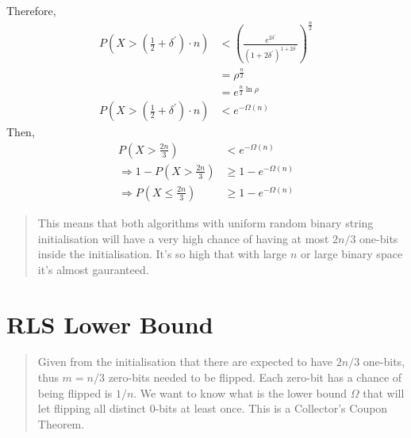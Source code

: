 \documentclass[a4paper, 12pt]{article}
\begin{document}
        Therefore,
        \begin{align*}
            P\left(X > \left(\frac{1}{2} + \delta^\prime\right)\cdot n\right)
            &< \left(\frac{e^{2\delta^\prime}}{(1+2\delta^\prime)^{1+2\delta^\prime}}\right)^{\frac{n}{2}}\\
            &= \rho^{\frac{n}{2}}\\
            &= e^{\frac{n}{2}\ln\rho}\\
            P\left(X > \left(\frac{1}{2} + \delta^\prime\right)\cdot n\right)
            &< e^{-\Omega(n)}
        \end{align*}
        Then,
        \begin{align*}
            P\left(X > \frac{2n}{3}\right) &< e^{-\Omega(n)}\\
            \Rightarrow 1 - P\left(X > \frac{2n}{3}\right) &\geq 1 - e^{-\Omega(n)}\\
            \Rightarrow P\left(X \leq \frac{2n}{3}\right) &\geq 1 - e^{-\Omega(n)}
        \end{align*}
        \begin{quote}
            This means that both algorithms with uniform random binary string initialisation will have a very high chance of having at most $2n/3$ one-bits
            inside the initialisation. It's so high that with large $n$ or large binary space it's almost gauranteed.
        \end{quote}
\section{RLS Lower Bound}
        \begin{quote}
            Given from the initialisation that there are expected to have $2n/3$ one-bits, thus $m = n/3$ zero-bits needed to be flipped. Each zero-bit has a chance
            of being flipped is $1/n$. We want to know what is the lower bound $\Omega$ that will let flipping all distinct 0-bits at least once. This is a 
            Collector's Coupon Theorem.
        \end{quote}
\end{document}
